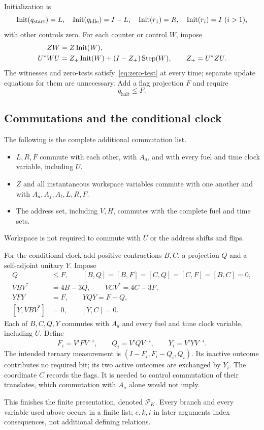 Initialization is
\[
 \operatorname{Init}(q_{\mathrm{start}})=L,\quad \operatorname{Init}(q_{\mathrm{idle}})=I-L,\quad
 \operatorname{Init}(r_1)=R,\quad \operatorname{Init}(r_i)=I\ (i>1),
\]
with other controls zero. For each counter or control $W$, impose
\begin{align}
 ZW&=Z\operatorname{Init}(W),\label{eq:initialize}\\
 U^*WU&=Z_+\operatorname{Init}(W)+(I-Z_+)\operatorname{Step}(W),\qquad Z_+=U^*ZU.\label{eq:transition}
\end{align}
The witnesses and zero-tests satisfy~\eqref{eq:zero-test} at every time; separate update equations for them are unnecessary. Add a flag projection $F$ and require
\begin{equation}\label{eq:halt-flag}
 q_{\mathrm{halt}}\le F.
\end{equation}

\subsection{Commutations and the conditional clock}
The following is the complete additional commutation list.
\begin{itemize}[leftmargin=*,itemsep=2pt]
\item $L,R,F$ commute with each other, with $A_a$, and with every fuel and time clock variable, including $U$.
\item $Z$ and all instantaneous workspace variables commute with one another and with $A_a,A_f,A_t,L,R,F$.
\item The address set, including $V,H$, commutes with the complete fuel and time sets.
\end{itemize}
Workspace is not required to commute with $U$ or the address shifts and flips.

For the conditional clock add positive contractions $B,C$, a projection $Q$ and a self-adjoint unitary $Y$. Impose
\begin{align}
 Q&\le F,\qquad [B,Q]=[B,F]=[C,Q]=[C,F]=[B,C]=0,\label{eq:conditional-comm}\\
 VBV^*&=4B-3Q,\qquad VCV^*=4C-3F,\label{eq:conditional-affine}\\
 YFY&=F,\qquad YQY=F-Q,\label{eq:conditional-flip}\\
 [Y,VBV^*]&=0,\qquad [Y,C]=0.\label{eq:conditional-tail}
\end{align}
Each of $B,C,Q,Y$ commutes with $A_a$ and every fuel and time clock variable, including $U$. Define
\begin{equation}\label{eq:optional-translates}
 F_i=V^iFV^{-i},\qquad Q_i=V^iQV^{-i},\qquad Y_i=V^iYV^{-i}.
\end{equation}
The intended ternary measurement is $(I-F_i,F_i-Q_i,Q_i)$. Its inactive outcome contributes no required bit; its two active outcomes are exchanged by $Y_i$. The coordinate $C$ records the flags. It is needed to control commutation of their translates, which commutation with $A_a$ alone would not imply.

This finishes the finite presentation, denoted $\mathcal P_K$. Every branch and every variable used above occurs in a finite list; $e,k,i$ in later arguments index consequences, not additional defining relations.
